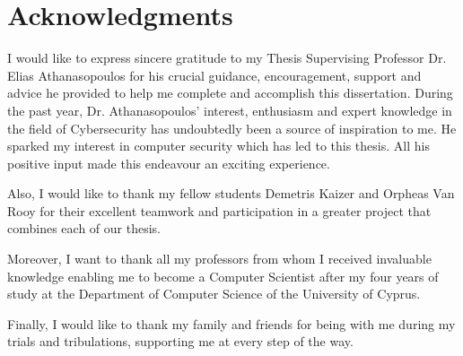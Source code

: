 \section*{\LARGE{Acknowledgments}}

I would like to express sincere gratitude to my Thesis Supervising Professor Dr. Elias Athanasopoulos for his crucial guidance, encouragement, support and advice he provided to help me complete and accomplish this dissertation. During the past year, Dr. Athanasopoulos' interest, enthusiasm and expert knowledge in the field of Cybersecurity has undoubtedly been a source of inspiration to me. He sparked my interest in computer security which has led to this thesis. All his positive input made this endeavour an exciting experience. 

Also, I would like to thank my fellow students Demetris Kaizer and Orpheas Van Rooy for their excellent teamwork and participation in a greater project that combines each of our thesis.

Moreover, I want to thank all my professors from whom I received invaluable knowledge enabling me to become a Computer Scientist after my four years of study at the Department of Computer Science of the University of Cyprus.

Finally, I would like to thank my family and friends for being with me during my trials and tribulations, supporting me at every step of the way.
